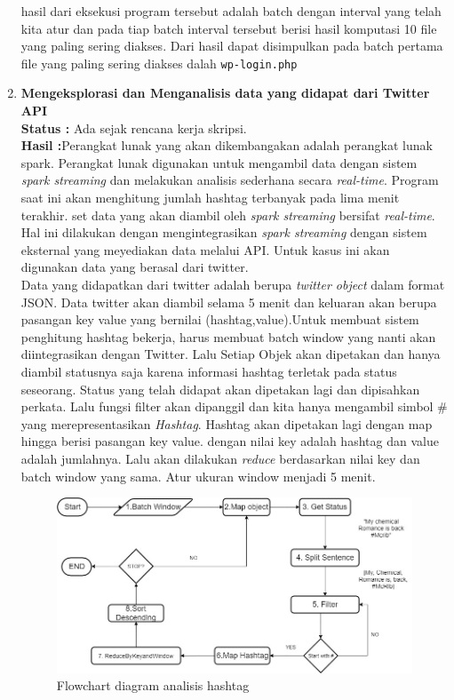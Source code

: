 \documentclass[a4paper,twoside]{article}
\begin{document}
\begin{enumerate}
		hasil dari eksekusi program tersebut adalah batch dengan interval yang telah kita atur dan 				pada tiap batch interval tersebut berisi hasil komputasi 10 file yang paling sering diakses. 		Dari hasil dapat disimpulkan pada batch pertama file yang paling sering diakses dalah 					\texttt{wp-login.php}

		\item \textbf{Mengeksplorasi dan Menganalisis data yang didapat dari Twitter API}\\
		{\bf Status :} Ada sejak rencana kerja skripsi.\\
		{\bf Hasil :}Perangkat lunak yang akan dikembangakan adalah perangkat lunak spark. Perangkat lunak digunakan untuk mengambil data dengan sistem \textit{spark streaming} dan melakukan analisis sederhana secara \textit{real-time}. Program saat ini akan menghitung jumlah hashtag terbanyak pada lima menit terakhir. set data yang akan diambil oleh \textit{spark streaming} bersifat \textit{real-time}. Hal ini dilakukan dengan mengintegrasikan \textit{spark streaming} dengan sistem eksternal yang meyediakan data melalui API. Untuk kasus ini akan digunakan data yang berasal dari twitter.\\
Data yang didapatkan dari twitter adalah berupa \textit{twitter object} dalam format JSON. Data twitter akan diambil selama 5 menit dan keluaran akan berupa pasangan key value yang bernilai (hashtag,value).Untuk membuat sistem penghitung hashtag bekerja, harus membuat batch window yang nanti akan diintegrasikan dengan Twitter. Lalu Setiap Objek akan dipetakan dan hanya diambil statusnya saja karena informasi hashtag terletak pada status seseorang. Status yang telah didapat akan dipetakan lagi dan dipisahkan perkata. Lalu fungsi filter akan dipanggil dan kita hanya mengambil simbol \# yang merepresentasikan \textit{Hashtag}. Hashtag akan dipetakan lagi dengan map hingga berisi pasangan key value. dengan nilai key adalah hashtag dan value adalah jumlahnya. Lalu akan dilakukan \textit{reduce} berdasarkan nilai key dan batch window yang sama. Atur ukuran window menjadi 5 menit.

		\begin{figure}[H] 
		\centering  
		\includegraphics[scale=0.5]{HashtagFlow}  
		\caption[Twitter Obejct]{Flowchart diagram analisis hashtag} 
		\label{fig:processing-events relationship} 
		\end{figure}
		

\end{enumerate}
\end{document}

